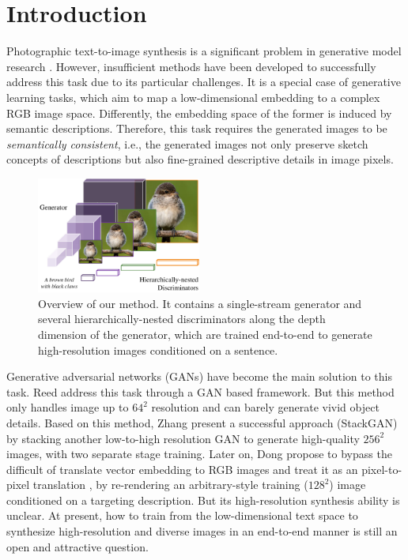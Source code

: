 \documentclass[10pt,twocolumn,letterpaper]{article}
\begin{document}
\section{Introduction}
Photographic text-to-image synthesis is a significant problem in generative model research \cite{reed2016generative}. However, insufficient methods have been developed to successfully address this task due to its particular challenges. It is a special case of generative learning tasks, which aim to map a low-dimensional embedding to a complex RGB image space. Differently, the embedding space of the former is induced by semantic descriptions. Therefore, this task requires the generated images to be \textit{semantically consistent}, i.e., the generated images not only preserve sketch concepts of descriptions but also fine-grained descriptive details in image pixels. 


\begin{figure}[t]
	\centering
	\includegraphics[width=0.48\textwidth]{figure/intro.pdf}
	\vspace{-.4cm}
	\caption{Overview of our method. It contains a single-stream generator and several hierarchically-nested discriminators along the depth dimension of the generator, which are trained end-to-end to generate high-resolution images conditioned on a sentence.} \label{fig:archs-review} \vspace{-.4cm}
\end{figure}

Generative adversarial networks (GANs) have become the main solution to this task. 
Reed \etal \cite{reed2016generative} address this task through a GAN based framework. But this method only handles image up to $64^2$ resolution and can barely generate vivid object details.
Based on this method, Zhang \etal \cite{han2017stackgan} present a successful approach (StackGAN) by stacking another low-to-high resolution GAN to generate high-quality $256^2$ images, with two separate stage training. Later on, Dong \etal \cite{dong2017semantic} propose to bypass the difficult of translate vector embedding to RGB images and treat it as an pixel-to-pixel translation \cite{isola2016image}, by re-rendering an arbitrary-style training ($128^2$) image conditioned on a targeting description. But its high-resolution synthesis ability is unclear. 
At present, how to train from the low-dimensional text space to synthesize high-resolution and diverse images in an end-to-end manner is still an open and attractive question. 
\end{document}
